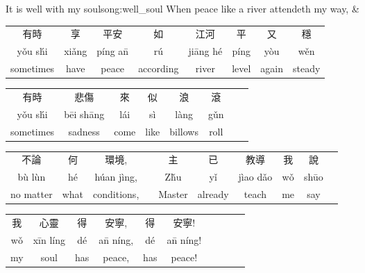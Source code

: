 \begin{tbls}{It is well with my soul}{song:well_soul}
   When peace like a river attendeth my way,
   &
\end{tbls}


\begin{tabular}{*{8}{c}}
   有時            & 享        & 平安            & 如        & 江河             & 平       & 又     & 穩     \\
   y\v{o}u s\'{h}i & xi\v{a}ng & p\'{i}ng a\={n} & r\'{u}    & ji\={a}ng h\'{e} & p\'{i}ng & y\`{o}u & w\v{e}n\\
   sometimes       & have      & peace           & according & river            & level    & again  & steady 
\end{tabular}

\begin{tabular}{*{8}{c}}
   有時            & 悲傷              & 來      & 似     & 浪       & 滾        \\
   y\v{o}u s\'{h}i & b\={e}i sh\={a}ng & l\'{a}i & s\`{i} & l\`{a}ng & g\v{u}n   \\
   sometimes       & sadness           & come    & like   & billows  & roll    
\end{tabular}

\begin{tabular}{*{10}{c}}
   不論           & 何     & 環境,              & & 主      & 已      & 教導             & 我     & 說       \\
   b\`{u} l\`{u}n & h\'{e} & h\'{u}an j\`{i}ng, & & Z\v{h}u & y\v{i}  & j\`{i}ao d\v{a}o & w\v{o} & sh\={u}o \\
   no matter      & what   & conditions,        & & Master  & already & teach            & me     & say      
\end{tabular}


\begin{tabular}{*{10}{c}}
   我     & 心靈             & 得     & 安寧,            & 得     & 安寧!            \\
   w\v{o} & x\={i}n l\'{i}ng & d\'{e} & a\={n} n\'{i}ng, & d\'{e} & a\={n} n\'{i}ng! \\
   my     & soul             & has    & peace,           & has    & peace!
\end{tabular}

